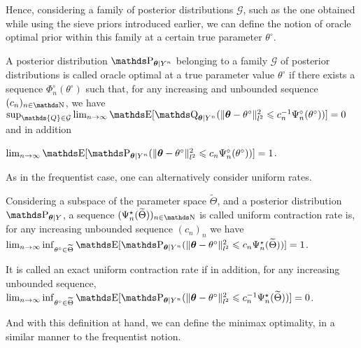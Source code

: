 Hence, considering a family of posterior distributions $\mathcal{G}$, such as the one obtained while using the sieve priors introduced earlier, we can define the notion of oracle optimal prior within this family at a certain true parameter $\theta^{\circ}$.

\begin{de}
A posterior distribution $\P_{\boldsymbol{\theta} \vert Y^{n}}$ belonging to a family $\mathcal{G}$ of posterior distributions is called oracle optimal at a true parameter value $\theta^{\circ}$ if there exists a sequence $\Phi^{\circ}_{n}(\theta^{\circ})$ such that, for any increasing and unbounded sequence $(c_{n})_{n \in \N}$, we have $\sup_{\mathds{Q} \in \mathcal{G}} \lim_{n \to \infty} \E[\Q_{\boldsymbol{\theta} \vert Y^{n}}(\Vert \boldsymbol{\theta} - \theta^{\circ} \Vert_{l^{2}}^{2} \leq c_{n}^{-1} \Psi_{n}^{\circ}(\theta^{\circ}))] = 0$ and in addition

$\lim_{n \to \infty} \E[\P_{\boldsymbol{\theta} \vert Y^{n}}(\Vert \boldsymbol{\theta} - \theta^{\circ} \Vert_{l^{2}}^{2} \leq c_{n} \Psi_{n}^{\circ}(\theta^{\circ}))] = 1$.
\assEnd
\end{de}

As in the frequentist case, one can alternatively consider uniform rates.

\begin{de}
Considering a subspace of the parameter space $\widetilde{\Theta}$, and a posterior distribution $\P_{\boldsymbol{\theta} \vert Y}$, a sequence $(\Psi^{\star}_{n}(\widetilde{\Theta}))_{n \in \N}$ is called uniform contraction rate is, for any increasing unbounded sequence $(c_{n})_{n}$ we have $\lim_{n \to \infty} \inf_{\theta^{\circ} \in \widetilde{\Theta}} \E[\P_{\boldsymbol{\theta} \vert Y^{n}}(\Vert \boldsymbol{\theta} - \theta^{\circ} \Vert_{l^{2}}^{2} \leq c_{n} \Psi^{\star}_{n}(\widetilde{\Theta}))] = 1$.

It is called an exact uniform contraction rate if in addition, for any increasing unbounded sequence, $\lim_{n \to \infty} \inf_{\theta^{\circ} \in \widetilde{\Theta}} \E[\P_{\boldsymbol{\theta} \vert Y^{n}}(\Vert \boldsymbol{\theta} - \theta^{\circ} \Vert_{l^{2}}^{2} \leq c_{n}^{-1} \Psi^{\star}_{n}(\widetilde{\Theta}))] = 0$.
\assEnd
\end{de}

And with this definition at hand, we can define the minimax optimality, in a similar manner to the frequentist notion.

